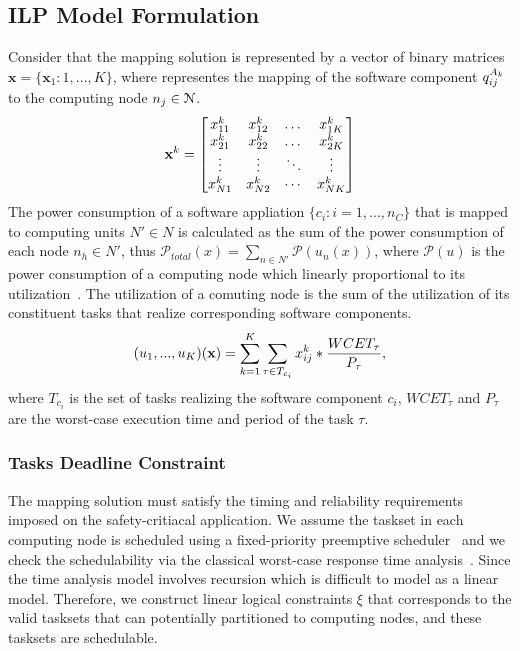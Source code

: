 \subsection{ILP Model Formulation}
Consider that the mapping solution is represented by a vector of binary matrices $\textbf{x}=\{\textbf{x}_1:1,...,K\}$, where \ttxkij representes the mapping of the software component $\sss{q}[k][ij]$ to the computing node $\ssb{n}[j]\in \mathcal{N}$. 
\begin{equation}
\label{eqn_solution}
\bspx{k}=
\begin{bmatrix} 
\ssx{k}{11} & \ssx{k}{12} & \dots & \ssx{k}{1K}\\
\ssx{k}{21} & \ssx{k}{22} & \dots & \ssx{k}{2K}\\
\vdots & \vdots & \ddots & \vdots\\
\ssx{k}{N1} & \ssx{k}{N2} & \cdots & \ssx{k}{NK}
\end{bmatrix}
\end{equation}
The power consumption of a software appliation $\{c_i:i=1,...,n_C\}$ that is mapped to computing units $N'\in N$ is calculated as the sum of the power consumption of each node $n_h\in N'$, thus $\mathcal{P}_{total}(x)=\sum_{n\in N'}{\mathcal{P}(u_n(x))}$, where $\mathcal{P}(u)$ is the power consumption of a computing node which linearly proportional to its utilization~\cite{Mahmud5222}. The utilization of a comuting node is the sum of the utilization of its constituent tasks that realize corresponding software components.
\begin{align}
	(u_1,...,u_K)(\textbf{x})=\sum_{k=1}^{K}\sum_{\tau\in T_{c_i}}{x^{k}_{ij}*\frac{WCET_\tau}{P_\tau}},
\end{align}
where $T_{c_i}$ is the set of tasks realizing the software component $c_i$, $WCET_\tau$ and $P_\tau$ are the worst-case execution time and  period of the task $\tau$.

\subsubsection{Tasks Deadline Constraint}
The mapping solution must satisfy the timing and reliability requirements imposed on the safety-critiacal application. We assume the taskset in each computing node is scheduled using a fixed-priority preemptive scheduler~\cite{Sha2004RealPerspective} and we check the schedulability via the classical worst-case response time analysis~\cite{Baruah2011Response-timeSystems}. Since the time analysis model involves recursion which is difficult to model as a linear model. Therefore, we construct linear logical constraints $\xi$ that corresponds to the valid tasksets that can potentially partitioned to computing nodes, and these tasksets are schedulable.


